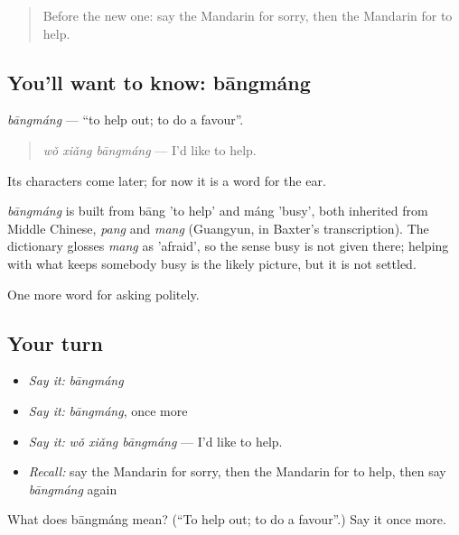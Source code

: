 \begin{quote}
Before the new one: say the Mandarin for sorry, then the Mandarin for to help.
\end{quote}

\subsection*{You'll want to know: bāngmáng}
\emph{bāngmáng} — \textquotedblleft{}to help out; to do a favour\textquotedblright{}.

\begin{quote}
\emph{wǒ xiǎng bāngmáng} — I'd like to help.
\end{quote}

Its characters come later; for now it is a word for the ear.

\begin{cousinweb}
\emph{bāngmáng} is built from bāng 'to help' and máng 'busy', both inherited from Middle Chinese, \emph{pang} and \emph{mang} (Guangyun, in Baxter's transcription). The dictionary glosses \emph{mang} as 'afraid', so the sense busy is not given there; helping with what keeps somebody busy is the likely picture, but it is not settled.
\end{cousinweb}

\begin{grammarlens}[title={What you've built}]
One more word for asking politely.
\end{grammarlens}

\subsection*{Your turn}
\begin{itemize}
\raggedright
  \item \emph{Say it:} \emph{bāngmáng}
  \item \emph{Say it:} \emph{bāngmáng}, once more
  \item \emph{Say it:} \emph{wǒ xiǎng bāngmáng} — I'd like to help.
  \item \emph{Recall:} say the Mandarin for sorry, then the Mandarin for to help, then say \emph{bāngmáng} again
\end{itemize}

\begin{tcolorbox}[breakable,colback=teal!4,colframe=teal!35!black,title={Before you move on}]
What does bāngmáng mean? (\textquotedblleft{}To help out; to do a favour\textquotedblright{}.) Say it once more.
\end{tcolorbox}
